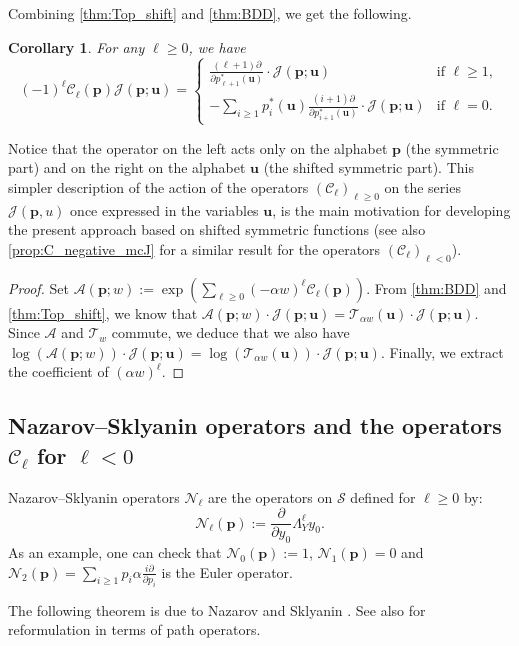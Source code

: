 \documentclass[12pt]{amsart}
\newtheorem{cor}[thm]{Corollary}
\theoremstyle{remark}
\newcommand{\bfp}{\boldsymbol{p}}
\newcommand{\bfu}{\boldsymbol{u}}
\newcommand{\C}{\mathcal C}
\newcommand{\mcA}{\mathcal{A}}
\newcommand{\Top}{\mathcal{T}}
\newcommand{\mcJ}{\mathcal{J}}
\newcommand{\mcS}{\mathcal{S}}
\newcommand{\N}{\mathcal{N}}
\begin{document}
Combining \cref{thm:Top_shift} and \cref{thm:BDD}, we get the following.
\begin{cor}\label{cor:Top}
    For any $\ell\geq 0$, we have
    $$(-1)^\ell\C_\ell(\bfp)\mathcal{J}(\bfp;\bfu)=\begin{cases}
        \frac{(\ell+1)\partial}{\partial p^*_{\ell+1}(\bfu)}\cdot \mcJ(\bfp;\bfu)&\text{if }\ell\geq 1,\\
        -\sum_{i\geq 1}p_i^*(\bfu)\frac{(i+1)\partial}{\partial p^*_{i+1}(\bfu)}\cdot \mcJ(\bfp;\bfu)&\text{if $\ell=0$}.
    \end{cases}$$
\end{cor}
Notice that the operator on the left acts only on the alphabet $\bfp$ (the symmetric part) and on the right on the alphabet $\bfu$ (the shifted symmetric part). This simpler description of the action of the operators $(\C_\ell)_{\ell\geq 0}$ on the series $\mcJ(\bfp,u)$ once expressed in the variables $\bfu$, is the main motivation for developing the present approach based on shifted symmetric functions (see also \cref{prop:C_negative_mcJ} for a similar result for the operators $(\C_\ell)_{\ell< 0}$).
\begin{proof}
    Set $\mcA(\bfp;w):=\exp\left(\sum_{\ell\geq 0}(-\alpha w)^\ell\C_\ell(\bfp)\right)$.
    From \cref{thm:BDD} and \cref{thm:Top_shift}, we know that
    $\mcA(\bfp;w)\cdot \mathcal{J}(\bfp;\bfu)=\Top_{\alpha w}(\bfu)\cdot \mathcal{J}(\bfp;\bfu).$
    Since $\mcA$ and $\Top_w$ commute, we deduce that we also have
    $\log(\mcA(\bfp;w))\cdot \mathcal{J}(\bfp;\bfu)=\log(\Top_{\alpha w}(\bfu))\cdot \mathcal{J}(\bfp;\bfu).$ Finally, we extract the coefficient of $(\alpha w)^\ell$.
\end{proof}


\subsection{Nazarov--Sklyanin operators and the operators \texorpdfstring{$\C_\ell$}{Cl} for \texorpdfstring{$\ell<0$}{l<0}}\label{ssec:NS}

Nazarov--Sklyanin operators $\N_{\ell}$ are the operators on $\mcS$ defined for $\ell\geq 0$ by: 
$$\N_\ell(\bfp):=\frac{\partial}{\partial y_0} \Lambda_Y^{\ell} y_0.$$
As an example, one can check that $\N_0(\bfp):=1$, $\N_1(\bfp)=0$ and $\N_2(\bfp)=\sum_{i\geq 1}p_i\alpha\frac{i\partial}{\partial p_i}$ is the Euler operator.

The following theorem is due to Nazarov and Sklyanin \cite[Theorem 2]{NazarovSklyanin2013}. See also \cite{Moll2023,BenDaliDolega2023} for reformulation in terms of path operators.
\end{document}
